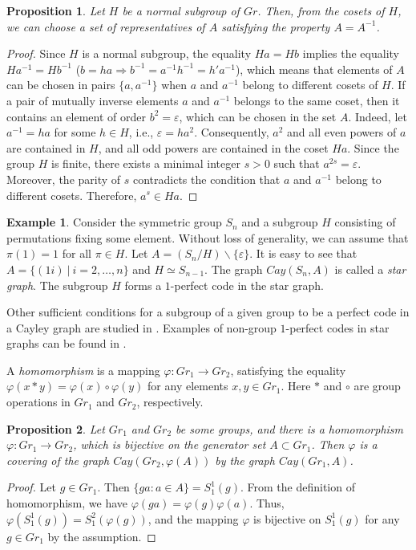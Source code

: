 \documentclass[11pt]{article}
\newtheorem{claim}{Proposition}[section]
\theoremstyle{definition}
\newtheorem{example}{Example}[section]
\begin{document}
{{{\begin{claim}
Let $H$ be a normal subgroup of $Gr$. Then, from the cosets
of $H$, we can choose a set of representatives of $A$ satisfying
the property $A=A^{-1}$.
\end{claim}
\begin{proof}
Since $H$
is a normal subgroup, the equality $Ha=Hb$ implies the equality
$Ha^{-1}=Hb^{-1}$ ($b=ha\Rightarrow b^{-1}=a^{-1}h^{-1}=h'a^{-1}$),
which means that elements of $A$ can be chosen in pairs
$\{a,a^{-1}\}$ when $a$ and $a^{-1}$ belong to different cosets
of $H$. If a pair of mutually inverse elements $a$ and
$a^{-1}$ belongs to the same coset, then it contains an element
of order $b^2= \varepsilon$, which can be chosen in the set $A$. Indeed, let $a^{-1}=ha$
for some $h\in H$, i.e., $\varepsilon=ha^2$. Consequently,
$a^2$ and all even powers of $a$ are contained in $H$, and all
odd powers are contained in the coset $Ha$. Since the group
$H$ is finite, there exists a minimal integer $s>0$ such that
$a^{2s}=\varepsilon$. Moreover, the parity of $s$ contradicts
the condition that $a$ and $a^{-1}$ belong to different cosets. Therefore, $a^s\in Ha$. \end{proof}

\begin{example}
Consider the symmetric group $S_n$ and a subgroup $H$ consisting of
permutations fixing some element. Without loss
of generality, we can assume that $\pi(1)=1$ for all $\pi\in H$. Let
$A=(S_n/H)\backslash \{\varepsilon\}$. It is easy to see that
$A=\{(1i) \ |\ i=2,\dots, n\}$ and $H\simeq S_{n-1}$. The graph
$Cay(S_n,A)$ is called a {\sl star graph}. The subgroup $H$ forms a $1$-perfect code in the
star graph. 
\end{example}

Other sufficient conditions for a subgroup of a given group to be a  perfect code in a Cayley graph are studied in \cite{Huang}. Examples of non-group
$1$-perfect codes in star graphs can be found in \cite{Mog20}. 




A {\sl homomorphism}  is a mapping $\varphi:  Gr_1 \rightarrow Gr_2$,
satisfying the equality $\varphi(x*y)=\varphi(x)\circ\varphi(y)$
for any elements $x,y\in Gr_1$. Here $*$ and $\circ$ are group
operations in $Gr_1$ and $Gr_2$, respectively. 


\begin{claim}
Let $Gr_1$ and $Gr_2$ be some groups, and there is a
homomorphism $\varphi:Gr_1\rightarrow
Gr_2$, which is bijective on the generator set
$A\subset Gr_1$. Then $\varphi$ is a covering
of the graph $Cay(Gr_2,\varphi(A))$ by the graph $Cay(Gr_1,A)$.
\end{claim}
\begin{proof}
Let $g\in Gr_1$. Then $\{ga : a\in A\}=S^1_1(g)$. From
the definition of homomorphism, we have $\varphi(ga)=\varphi(g)\varphi(a)$.
Thus, $\varphi(S^1_1(g))=S^2_1(\varphi(g))$, and the mapping
$\varphi$ is bijective on $S^1_1(g)$ for any $g\in Gr_1$ by
the assumption.
\end{proof}

}}}
\end{document}
